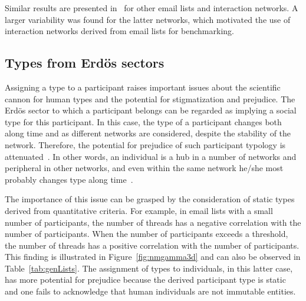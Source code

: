 Similar results are presented in~\cite{stab} for other email lists and interaction networks. A larger variability was found for the latter networks,
which motivated the use of interaction networks derived from email lists for benchmarking.


\subsection{Types from Erd\"os sectors}\label{sec:pty}


Assigning a type to a participant raises important issues about the scientific cannon for human types and the potential for stigmatization and prejudice. The Erd\"os sector to which a participant belongs can be regarded as implying a social type for this participant.
In this case, the type of a participant changes both along time and as different networks are considered, despite the stability of the network. Therefore, the potential for prejudice of such participant typology is attenuated~\cite{adorno}. In other words, an individual is a hub in a number of networks and peripheral in other networks, and even within the same network he/she most probably changes type along time~\cite{animacoes}.

The importance of this issue can be grasped by the consideration of static types derived from quantitative criteria. For example, in email lists with a small number of participants, the number of threads has a negative correlation with the number of participants.
When the number of participants exceeds a threshold, the number of threads has a positive correlation with the number of participants.
This finding is illustrated in Figure~\ref{fig:nmgamma3d}
and can also be observed in Table~\ref{tab:genLists}.
The assignment of types to individuals, in this latter case,
has more potential for prejudice because
the derived participant type is static and
one fails to acknowledge that
human individuals are not immutable entities.


